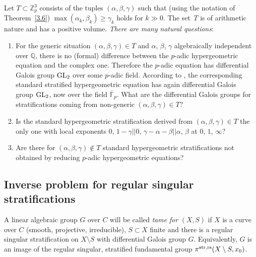 \documentclass[10pt,a4paper]{amsart}
\numberwithin{equation}{section}
\begin{document}
Let $T\subset \mathbb{Z}_p^3$ consists of the tuples $(\alpha ,\beta, \gamma )$ such that (using the notation of Theorem~\ref{3.6}) $\max(\alpha_k,\beta_k)\geq \gamma_k$ holds for $k\gg 0$. The set~$T$ is of arithmetic nature and has a positive volume. {\it There are many natural questions}:
\begin{enumerate}\itemsep=0pt
\item[(a)] For the generic situation $(\alpha, \beta ,\gamma )\in T$ and $\alpha$, $\beta$, $\gamma$ algebraically independent over $\mathbb{Q}$, there is no (formal) difference between the $p$-adic hypergeometric equation and the complex one. Therefore the $p$-adic equation has differential Galois group ${\rm GL}_2$ over some $p$-adic field. According to \cite[Section~8]{Ma-vdP1}, the corresponding standard stratified hypergeometric equation has again differential Galois group ${\rm GL}_2$, now over the field $\overline{\mathbb{F}}_p$. What are the differential Galois groups for stratifications coming from non-generic $(\alpha,\beta,\gamma)\in T$?
\item[(b)] Is the standard hypergeometric stratification derived from $(\alpha, \beta ,\gamma )\in T$ the only one with local exponents $ 0$, $1-\gamma || 0$, $\gamma -\alpha -\beta || \alpha$, $\beta $ at $0$, $1$, $\infty$?
\item[(c)] Are there for $(\alpha, \beta, \gamma )\not \in T$ standard hypergeometric stratifications not obtained by reducing $p$-adic hypergeometric equations?
\end{enumerate}

\subsection{Inverse problem for regular singular stratifications}\label{section3.3}
A linear algebraic group $G$ over $C$ will be called {\it tame for $(X,S)$} if $X$ is a curve over $C$ (smooth, projective, irreducible), $S\subset X$ finite and there is a regular singular stratification on $X\setminus S$ with differential Galois group $G$. Equivalently, $G$ is an image of the regular singular, stratified fundamental group $\pi^{\rm str,rs}(X\setminus S,x_0)$.
\end{document}
